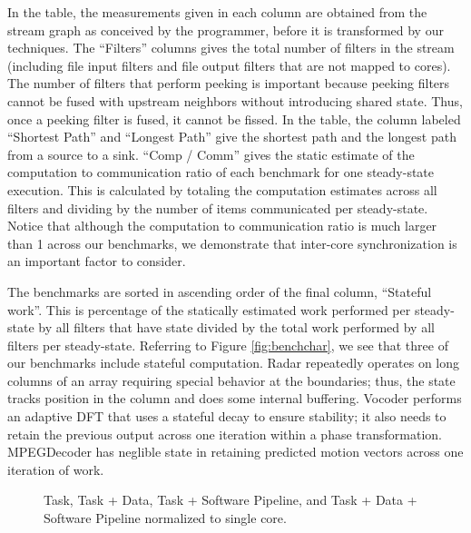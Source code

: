In the table, the measurements given in each column are obtained from
the stream graph as conceived by the programmer, before it is
transformed by our techniques.  The ``Filters'' columns gives the
total number of filters in the stream (including file input filters
and file output filters that are not mapped to cores).  The number of
filters that perform peeking is important because peeking filters
cannot be fused with upstream neighbors without introducing shared
state.  Thus, once a peeking filter is fused, it cannot be fissed. In
the table, the column labeled ``Shortest Path'' and ``Longest Path''
give the shortest path and the longest path from a source to a
sink. ``Comp / Comm'' gives the static estimate of the computation to
communication ratio of each benchmark for one steady-state
execution. This is calculated by totaling the computation estimates
across all filters and dividing by the number of items communicated
per steady-state. Notice that although the computation to
communication ratio is much larger than 1 across our benchmarks, we
demonstrate that inter-core synchronization is an important factor to
consider.

The benchmarks are sorted in ascending order of the final column,
``Stateful work''. This is percentage of the statically estimated work
performed per steady-state by all filters that have state divided by
the total work performed by all filters per steady-state.  Referring
to Figure \ref{fig:benchchar}, we see that three of our benchmarks
include stateful computation.  Radar repeatedly operates on long
columns of an array requiring special behavior at the boundaries;
thus, the state tracks position in the column and does some internal
buffering.  Vocoder performs an adaptive DFT that uses a stateful
decay to ensure stability; it also needs to retain the previous output
across one iteration within a phase transformation.  MPEGDecoder has
neglible state in retaining predicted motion vectors across one
iteration of work.

\begin{figure*}[t]
\centering
{}
\caption{Task, Task + Data, Task + Software Pipeline, and Task + Data + Software Pipeline
normalized to single core.
\protect\label{fig:main_comp}}
\vspace{-6pt}
\end{figure*}

